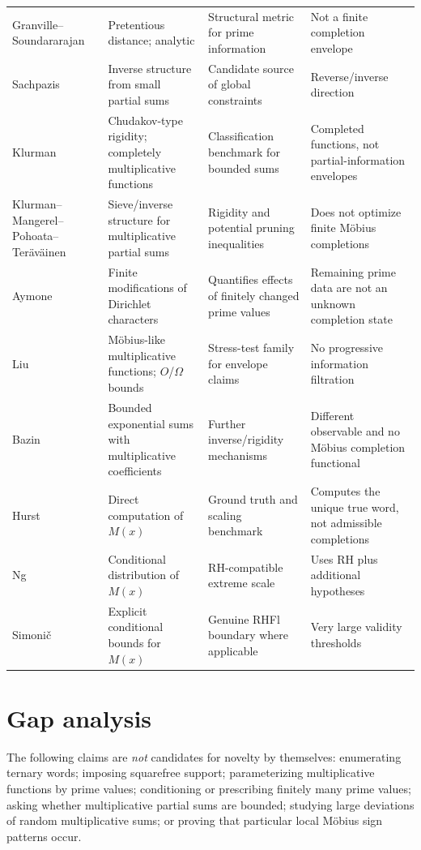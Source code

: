 \documentclass[11pt]{article}
\begin{document}
\begin{longtable}{p{}p{}p{}p{}}
Granville--Soundararajan \cite{GranvilleSound2007} & Pretentious distance; analytic & Structural metric for prime information & Not a finite completion envelope \\
Sachpazis \cite{Sachpazis2024} & Inverse structure from small partial sums & Candidate source of global constraints & Reverse/inverse direction \\
Klurman \cite{Klurman2018} & Chudakov-type rigidity; completely multiplicative functions & Classification benchmark for bounded sums & Completed functions, not partial-information envelopes \\
Klurman--Mangerel--Pohoata--Teräväinen \cite{KMPT2021} & Sieve/inverse structure for multiplicative partial sums & Rigidity and potential pruning inequalities & Does not optimize finite Möbius completions \\
Aymone \cite{Aymone2023Modified} & Finite modifications of Dirichlet characters & Quantifies effects of finitely changed prime values & Remaining prime data are not an unknown completion state \\
Liu \cite{Liu2022} & Möbius-like multiplicative functions; $O$/$\Omega$ bounds & Stress-test family for envelope claims & No progressive information filtration \\
Bazin \cite{Bazin2025} & Bounded exponential sums with multiplicative coefficients & Further inverse/rigidity mechanisms & Different observable and no Möbius completion functional \\

Hurst \cite{Hurst2018,Hurst2026} & Direct computation of $M(x)$ & Ground truth and scaling benchmark & Computes the unique true word, not admissible completions \\
Ng \cite{Ng2004} & Conditional distribution of $M(x)$ & RH-compatible extreme scale & Uses RH plus additional hypotheses \\
Simonič \cite{Simonic2022} & Explicit conditional bounds for $M(x)$ & Genuine RHFl boundary where applicable & Very large validity thresholds \\
\bottomrule
\end{longtable}
\normalsize
\setlength{\tabcolsep}{6pt}

\section{Gap analysis}
The following claims are \emph{not} candidates for novelty by themselves: enumerating ternary words; imposing squarefree support; parameterizing multiplicative functions by prime values; conditioning or prescribing finitely many prime values; asking whether multiplicative partial sums are bounded; studying large deviations of random multiplicative sums; or proving that particular local Möbius sign patterns occur.
\end{document}
